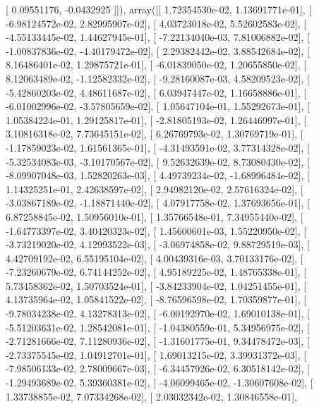 \documentclass{article}
\begin{document}
       [ 0.09551176, -0.0432925 ]]), array([[  1.72354530e-02,   1.13691771e-01],
       [ -6.98124572e-02,   2.82995907e-02],
       [  4.03723018e-02,   5.52602583e-02],
       [ -4.55133445e-02,   1.44627945e-01],
       [ -7.22134040e-03,   7.81006882e-02],
       [ -1.00837836e-02,  -4.40179472e-02],
       [  2.29382442e-02,   3.88542684e-02],
       [  8.16486401e-02,   1.29875721e-01],
       [ -6.01839050e-02,   1.20655850e-02],
       [  8.12063489e-02,  -1.12582332e-02],
       [ -9.28160087e-03,   4.58209523e-02],
       [ -5.42860203e-02,   4.48611687e-02],
       [  6.03947447e-02,   1.16658886e-01],
       [ -6.01002996e-02,  -3.57805659e-02],
       [  1.05647104e-01,   1.55292673e-01],
       [  1.05384224e-01,   1.29125817e-01],
       [ -2.81805193e-02,   1.26446997e-01],
       [  3.10816318e-02,   7.73645151e-02],
       [  6.26769793e-02,   1.30769719e-01],
       [ -1.17859023e-02,   1.61561365e-01],
       [ -4.31493591e-02,   3.77314328e-02],
       [ -5.32534083e-03,  -3.10170567e-02],
       [  9.52632639e-02,   8.73080430e-02],
       [ -8.09907048e-03,   1.52820263e-03],
       [  4.49739234e-02,  -1.68996484e-02],
       [  1.14325251e-01,   2.42638597e-02],
       [  2.94982120e-02,   2.57616324e-02],
       [ -3.03867189e-02,  -1.18871440e-02],
       [  4.07917758e-02,   1.37693656e-01],
       [  6.87258845e-02,   1.50956010e-01],
       [  1.35766548e-01,   7.34955440e-02],
       [ -1.64773397e-02,   3.40420323e-02],
       [  1.45600601e-03,   1.55220950e-02],
       [ -3.73219020e-02,   4.12993522e-03],
       [ -3.06974858e-02,   9.88729519e-03],
       [  4.42709192e-02,   6.55195104e-02],
       [  4.00439316e-03,   3.70133176e-02],
       [ -7.23260679e-02,   6.74144252e-02],
       [  4.95189225e-02,   1.48765338e-01],
       [  5.73458362e-02,   1.50703524e-01],
       [ -3.84233904e-02,   1.04251455e-01],
       [  4.13735964e-02,   1.05841522e-02],
       [ -8.76596598e-02,   1.70359877e-01],
       [ -9.78034238e-02,   4.13278313e-02],
       [ -6.00192970e-02,   1.69010138e-01],
       [ -5.51203631e-02,   1.28542081e-01],
       [ -1.04380559e-01,   5.34956975e-02],
       [ -2.71281666e-02,   7.11280936e-02],
       [ -1.31601775e-01,   9.34478472e-03],
       [ -2.73375545e-02,   1.04912701e-01],
       [  1.69013215e-02,   3.39931372e-03],
       [ -7.98506133e-02,   2.78009667e-03],
       [ -6.34457926e-02,   6.30518142e-02],
       [ -1.29493689e-02,   5.39360381e-02],
       [ -4.06099465e-02,  -1.30607608e-02],
       [  1.33738855e-02,   7.07334268e-02],
       [  2.03032342e-02,   1.30846558e-01],
\end{document}
